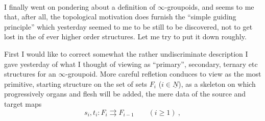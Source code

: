 \hfill{}\\
I finally went on pondering about a definition of $\infty$-groupoids, and  seems to me that, after all, the topological motivation does furnish the ``simple guiding principle'' which yesterday seemed to me to be still to be discovered,  not to get lost in the  of ever higher order structures. Let me try to put it down roughly.

\quad First I would like to correct somewhat the rather undiscriminate description I gave yesterday of what I thought of viewing as ``primary'', secondary, ternary etc structures for an $\infty$-groupoid. More careful refletion conduces to view as the most primitive, starting structure on the set of sets $F_i$ ($i\in\underline{N}$), as a skeleton on which progressively organs and flesh will be added, the mere data of the source and target maps
\[
s_i,t_i:F_i\rightrightarrows F_{i-1}\qquad(i\geq1)\ ,
\]
